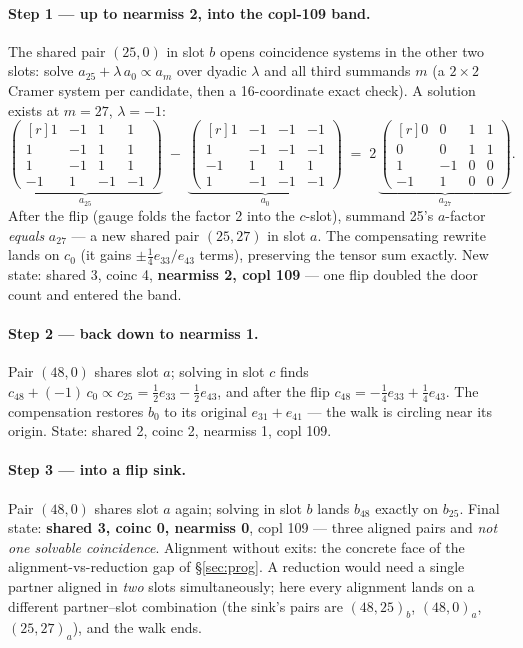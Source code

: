 \documentclass[10pt]{article}
\begin{document}
\paragraph{Step 1 --- up to nearmiss 2, into the copl-109 band.} The
shared pair $(25, 0)$ in slot $b$ opens coincidence systems in the
other two slots: solve $a_{25} + \lambda\, a_0 \propto a_m$ over
dyadic $\lambda$ and all third summands $m$ (a $2{\times}2$ Cramer
system per candidate, then a 16-coordinate exact check). A solution
exists at $m = 27$, $\lambda = -1$:
\[
\underbrace{\begin{pmatrix*}[r]
1 & -1 & 1 & 1\\ 1 & -1 & 1 & 1\\ 1 & -1 & 1 & 1\\ -1 & 1 & -1 & -1
\end{pmatrix*}}_{a_{25}}
\;-\;
\underbrace{\begin{pmatrix*}[r]
1 & -1 & -1 & -1\\ 1 & -1 & -1 & -1\\ -1 & 1 & 1 & 1\\ 1 & -1 & -1 & -1
\end{pmatrix*}}_{a_0}
\;=\;
2\,\underbrace{\begin{pmatrix*}[r]
0 & 0 & 1 & 1\\ 0 & 0 & 1 & 1\\ 1 & -1 & 0 & 0\\ -1 & 1 & 0 & 0
\end{pmatrix*}}_{a_{27}} .
\]
After the flip (gauge folds the factor 2 into the $c$-slot), summand
25's $a$-factor \emph{equals} $a_{27}$ --- a new shared pair
$(25, 27)$ in slot $a$. The compensating rewrite lands on $c_0$ (it
gains $\pm\tfrac14 e_{33}/e_{43}$ terms), preserving the tensor sum
exactly. New state: shared 3, coinc 4, \textbf{nearmiss 2, copl 109}
--- one flip doubled the door count and entered the band.

\paragraph{Step 2 --- back down to nearmiss 1.} Pair $(48, 0)$ shares
slot $a$; solving in slot $c$ finds
$c_{48} + (-1)\, c_0 \propto c_{25} = \tfrac12 e_{33} - \tfrac12
e_{43}$, and after the flip $c_{48} = -\tfrac14 e_{33} + \tfrac14
e_{43}$. The compensation restores $b_0$ to its original
$e_{31} + e_{41}$ --- the walk is circling near its origin. State:
shared 2, coinc 2, nearmiss 1, copl 109.

\paragraph{Step 3 --- into a flip sink.} Pair $(48, 0)$ shares slot
$a$ again; solving in slot $b$ lands $b_{48}$ exactly on
$b_{25}$. Final state: \textbf{shared 3, coinc 0, nearmiss 0}, copl
109 --- three aligned pairs and \emph{not one solvable coincidence}.
Alignment without exits: the concrete face of the
alignment-vs-reduction gap of \S\ref{sec:prog}. A reduction would
need a single partner aligned in \emph{two} slots simultaneously;
here every alignment lands on a different partner--slot combination
(the sink's pairs are $(48,25)_b$, $(48,0)_a$, $(25,27)_a$), and the
walk ends.
\end{document}
